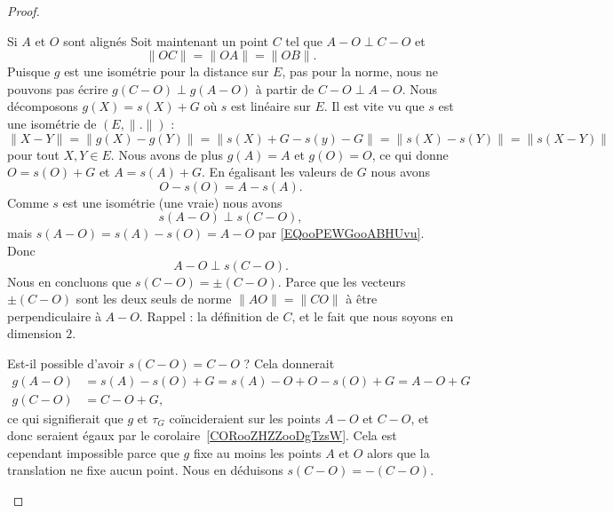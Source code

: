 \begin{proof}
\begin{subproof}
\begin{subproof}
			\item[Si \( A\) et \( O\) sont alignés]
			Soit maintenant un point \( C\) tel que \( A-O\perp C-O\) et
			\begin{equation}
				\| OC \|=\| OA \|=\| OB \|.
			\end{equation}
			Puisque \( g\) est une isométrie pour la distance sur \( E\), pas pour la norme, nous ne pouvons pas écrire \( g(C-O)\perp g(A-O)\) à partir de \( C-O\perp A-O\). Nous décomposons \( g(X)=s(X)+G\) où \( s\) est linéaire sur \( E\). Il est vite vu que \( s\) est une isométrie de \( (E,\| . \|)\) :
			\begin{equation}
				\| X-Y \|=\| g(X)-g(Y) \|=\| s(X)+G-s(y)-G \|=\| s(X)-s(Y) \|=\| s(X-Y) \|
			\end{equation}
			pour tout \( X,Y\in E\). Nous avons de plus \( g(A)=A\) et \( g(O)=O\), ce qui donne \( O=s(O)+G\) et \( A=s(A)+G\). En égalisant les valeurs de \( G\) nous avons
			\begin{equation}        \label{EQooPEWGooABHUvu}
				O-s(O)=A-s(A).
			\end{equation}
			Comme \( s\) est une isométrie (une vraie) nous avons
			\begin{equation}
				s(A-O)\perp s(C-O),
			\end{equation}
			mais \( s(A-O)=s(A)-s(O)=A-O\) par \eqref{EQooPEWGooABHUvu}. Donc
			\begin{equation}
				A-O\perp s(C-O).
			\end{equation}
			Nous en concluons que \( s(C-O)=\pm (C-O)\). Parce que les vecteurs \( \pm(C-O)\) sont les deux seuls de norme \( \| AO \| =\| CO \|\) à être perpendiculaire à \( A-O\). Rappel : la définition de \( C\), et le fait que nous soyons en dimension \( 2\).

			Est-il possible d'avoir \( s(C-O)=C-O\) ? Cela donnerait
			\begin{subequations}
				\begin{align}
					g(A-O) & =s(A)-s(O)+G=s(A)-O+O-s(O)+G=A-O+G \\
					g(C-O) & =C-O+G,
				\end{align}
			\end{subequations}
			ce qui signifierait que \( g\) et \( \tau_G\) coïncideraient sur les points \( A-O\) et \( C-O\), et donc seraient égaux par le corolaire~\ref{CORooZHZZooDgTzsW}. Cela est cependant impossible parce que \( g\) fixe au moins les points \( A\) et \( O\) alors que la translation ne fixe aucun point. Nous en déduisons \( s(C-O)=-(C-O)\).


\end{subproof}
\end{subproof}
\end{proof}
